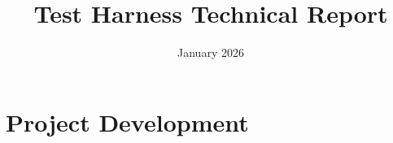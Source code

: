 \documentclass{article}
\title{Test Harness Technical Report}
\author{}
\date{January 2026}
\begin{document}
\maketitle

\hypertarget{toc}{}
\tableofcontents




\section{Project Development}
%









\printbibliography

\appendix


\end{document}
